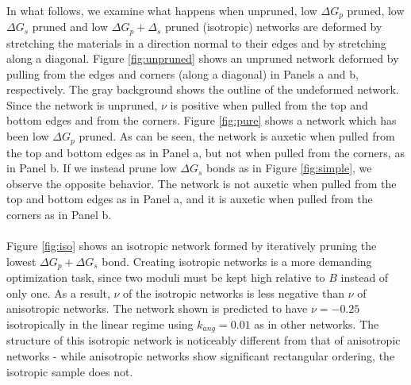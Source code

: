 \documentclass[9pt,twocolumn,twoside]{pnas-new}
\begin{document}
 \paragraph{}
 In what follows, we examine what happens when unpruned, low $\Delta G_{p}$ pruned, low $\Delta G_{s}$ pruned and low $\Delta G_{p} + \Delta_{s}$ pruned (isotropic) networks are deformed by stretching the materials in a direction normal to their edges and by stretching along a diagonal. Figure \ref {fig:unpruned} shows an unpruned network deformed by pulling from the edges and corners (along a diagonal) in Panels a and b, respectively.  The gray background shows the outline of the undeformed network.  Since the network is unpruned, $\nu$ is positive when pulled from the top and bottom edges and from the corners.  Figure \ref{fig:pure} shows a network which has been low $\Delta G_{p}$ pruned.  As can be seen, the network is auxetic when pulled from the top and bottom edges as in Panel a, but not when pulled from the corners, as in Panel b.  If we instead prune low $\Delta G_{s}$ bonds as in Figure \ref{fig:simple}, we observe the opposite behavior.  The network is not auxetic when pulled from the top and bottom edges as in Panel a, and it is auxetic when pulled from the corners as in Panel b.  
 \paragraph{}
 
 Figure \ref{fig:iso} shows an isotropic network formed by iteratively pruning the lowest $\Delta G_{p} + \Delta G_{s}$ bond.   Creating isotropic networks is a more demanding optimization task, since two moduli must be kept high relative to $B$ instead of only one.  As a result, $\nu$ of the isotropic networks is less negative than $\nu$ of anisotropic networks.  The network shown is predicted to have $\nu=-0.25$ isotropically in the linear regime using $k_{ang}=0.01$ as in other networks.  The structure of this isotropic network is noticeably different from that of anisotropic networks - while anisotropic networks show significant rectangular ordering, the isotropic sample does not.

 
 
\end{document}
